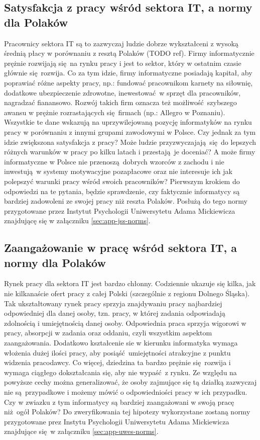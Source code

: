 \subsection{Satysfakcja z pracy wśród sektora IT, a normy dla Polaków}
\label{sec:hip-sat-norms}
Pracownicy sektora IT są to zazwyczaj ludzie dobrze wykształceni z wysoką średnią płacy w porównaniu z resztą Polaków (TODO ref). Firmy informatycznie prężnie rozwijają się na rynku pracy i jest to sektor, który w ostatnim czasie głównie się rozwija. Co za tym idzie, firmy informatyczne posiadają kapitał, aby poprawiać różne aspekty pracy, np.: fundować pracownikom karnety na siłownię, dodatkowe ubezpieczenie zdrowotne, inewestować w sprzęt dla pracowników, nagradzać
fianansowo. Rozwój takich firm oznacza też możliwość szybszego awansu w prężnie rozrastających się firmach (np.: Allegro w Poznaniu). Wszystkie te dane wskazują na uprzywilejowaną pozycję informatyków na rynku pracy w porównaniu z innymi grupami zawodowymi w Polsce. Czy jednak za tym idzie zwiększona satysfakcja z pracy? Może ludzie przyzwyczajają się do lepszych różnych warunków w pracy po kilku latach i przestają je doceniać? A może firmy informatyczne w Polsce nie
przenoszą dobrych wzorców z zachodu i nie inwestują w systemy motywacyjne pozapłacowe oraz nie interesuje ich jak polepszyć warunki pracy wśród swoich pracowników? Pierwszym krokiem do odpowiedzi na te pytania, będzie sprawdzenie, czy faktycznie informatycy są bardziej zadowoleni ze swojej pracy niż reszta Polaków. Posłużą do tego normy przygotowane przez Instytut Psychologii Uniwersytetu Adama Mickiewicza znajdującę się w załączniku \ref{sec:app-jss-norms}.

\subsection{Zaangażowanie w pracę wśród sektora IT, a normy dla Polaków}
Rynek pracy dla sektora IT jest bardzo chłonny. Codziennie ukazuje się kilka, jak nie kilkanaście ofert pracy z całej Polski (szczególnie z regionu Dolnego Śląska). Tak ukształtowany rynek pracy sprzyja znajdywaniu pracy najbardziej odpowiedniej dla danej osoby, tzn. pracy, w której zadania odpowiadają zdolnością i umiejętnością danej osoby. Odpowiednia praca sprzyja wigorowi w pracy, absorpcji w zadania oraz oddaniu, czyli wszystkim aspektom zaangażowania. Dodatkowo kształcenie
sie w kierunku informatyka wymaga włożenia dużej ilości pracy, aby posiąść umiejętności atrakcyjne z punktu widzenia pracodawcy. Co więcej, dziedzina ta bardzo prężnie się rozwija i wymaga ciągłego dokształcania się, aby nie wypaść z rynku. Ze względu na powyższe cechy można generalizować, że osoby zajmujące się tą działką zazwyczaj nie są przypadkowe i możemy mówić o odpowiedniości pracy w ich przypadku. Czy w zwiazku z tym informatycy są bardziej zaangażowani w swoją pracę
niż ogół Polaków? Do zweryfikowania tej hipotezy wykorzystane zostaną normy przygotowane prez Instytu Psychologii Uniwersytetu Adama Mickiewicza znajdujące się w załączniku \ref{sec:app-uwes-norms}. 
